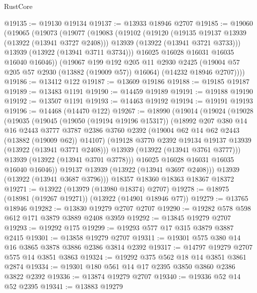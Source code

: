 \begin{lexlean}{RustCore}
\begin{coremodule}
@19135 := @19130 @19134
@19137 := @13933 @18946 @2707
@19185 := @19060
    (@19065
      (@19073
        (@19077
          (@19083
            (@19102
              (@19120
                (@19135 @19137 @13939 (@13922 (@13941 @3727 @2408)))
                @13939
                (@13922 (@13941 @3721 @3733)))
              @13939
              (@13922 (@13941 @3711 @3734)))
            @16025
            @16028
            @16031
            @16035
            @16040
            @16046))
        (@19067
          @199
          @192
          @205
          @11
          @2930
          @2425
          (@19004 @57 @205 @57 @2930 (@13882 (@19009 @57)) @16064)
          (@14232 @18946 @2707))))
@19186 := @13412 @122
@19187 := @13609 @19186
@19188 := @19185 @19187
@19189 := @13483 @1191
@19190 := @14459 @19189
@19191 := @19188 @19190
@19192 := @13507 @1191
@19193 := @14463 @19192
@19194 := @19191 @19193
@19196 := @14468 (@14470 @122)
@19267 := @18990
    (@19014
      (@19024
        (@19028
          (@19035
            (@19045
              (@19050 (@19194 @19196 @15317))
              (@18992
                @207
                @380
                @14
                @16
                @2443
                @3777
                @3787
                @2386
                @3760
                @2392
                (@19004 @62 @14 @62 @2443 (@13882 (@19009 @62)) @14107)
                (@19128 @3770 @2392 @19134 @19137 @13939 (@13922 (@13941 @3771 @2408)))
                @13939
                (@13922 (@13941 @3761 @3777)))
              @13939
              (@13922 (@13941 @3701 @3778)))
            @16025
            @16028
            @16031
            @16035
            @16040
            @16046))
        @19137
        @13939
        (@13922 (@13941 @3697 @2408)))
      @13939
      (@13922 (@13941 @3687 @3796)))
    @18357
    @18360
    @18363
    @18367
    @18372
@19271 := @13922 (@13979 (@13980 @18374) @2707)
@19278 := @18975 (@18981 (@19267 @19271)) (@13922 (@14901 @18946 @77))
@19279 := @13765 @18946
@19282 := @13830 @19279 @2707 @2707
@19290 := @19282 @578 @598 @612 @171 @3879 @3889 @2408 @3959
@19292 := @13845 @19279 @2707
@19293 := @19292 @175
@19299 := @19293 @577 @17 @315 @3879 @3887 @2415
@19301 := @13858 @19279 @2707
@19311 := @19301 @575 @380 @14 @16 @3865 @3878 @3886 @2386 @3814 @2392
@19317 := @14797 @19279 @2707 @575 @14 @3851 @3863
@19324 := @19292 @375 @562 @18 @14 @3851 @3861 @2874
@19334 := @19301 @180 @561 @14 @17 @2395 @3850 @3860 @2386 @3822 @2392
@19336 := @13874 @19279 @2707
@19340 := @19336 @52 @14 @52 @2395
@19341 := @13883 @19279

\end{coremodule}
\end{lexlean}
